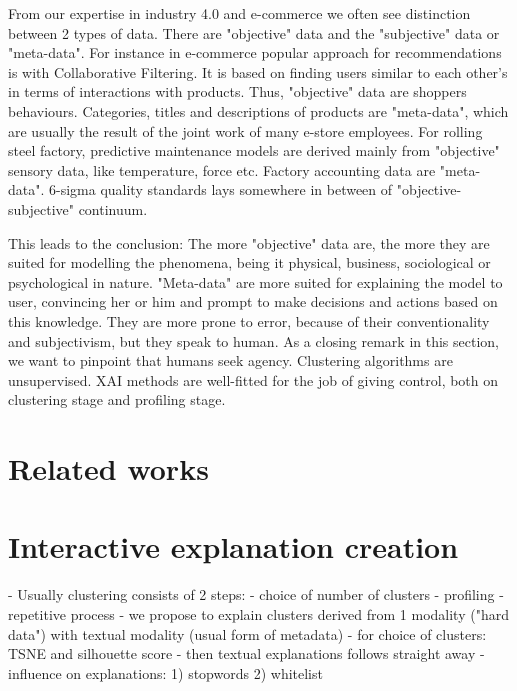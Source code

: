 \documentclass[
]{ceurart}
\begin{document}
From our expertise in industry 4.0 and e-commerce we often see distinction between 2 types of data.
There are "objective" data and the "subjective" data or "meta-data".
For instance in e-commerce popular approach for recommendations is with Collaborative Filtering.
It is based on finding users similar to each other's in terms of interactions with products.
Thus, "objective" data are shoppers behaviours.
Categories, titles and descriptions of products are "meta-data", which are usually the result of the joint work of many e-store employees.
For rolling steel factory, predictive maintenance models are derived mainly from "objective" sensory data, like temperature, force etc.
Factory accounting data are "meta-data".
6-sigma quality standards lays somewhere in between of "objective-subjective" continuum.

This leads to the conclusion:
The more "objective" data are, the more they are suited for modelling the phenomena, being it physical, business, sociological or psychological in nature.
"Meta-data" are more suited for explaining the model to user, convincing her or him and prompt to make decisions and actions based on this knowledge.
They are more prone to error, because of their conventionality and subjectivism, but they speak to human.
As a closing remark in this section, we want to pinpoint that humans seek agency.
Clustering algorithms are unsupervised.
XAI methods are well-fitted for the job of giving control, both on clustering stage and profiling stage.

\section{Related works}

\section{Interactive explanation creation}
- Usually clustering consists of 2 steps:
  - choice of number of clusters
  - profiling
  - repetitive process
- we propose to explain clusters derived from 1 modality ("hard data") with textual modality (usual form of metadata)
  - for choice of clusters: TSNE and silhouette score
  - then textual explanations follows straight away
  - influence on explanations: 1) stopwords 2) whitelist
\end{document}
